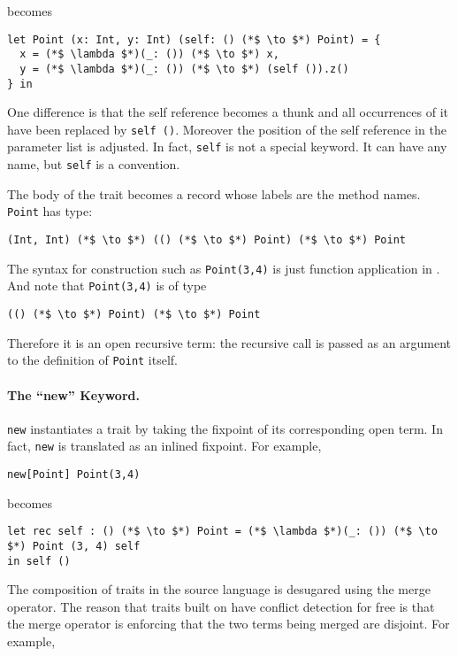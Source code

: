 \noindent becomes

\begin{lstlisting}
let Point (x: Int, y: Int) (self: () (*$ \to $*) Point) = {
  x = (*$ \lambda $*)(_: ()) (*$ \to $*) x,
  y = (*$ \lambda $*)(_: ()) (*$ \to $*) (self ()).z()
} in
\end{lstlisting}

One difference is that the self reference becomes a thunk and all occurrences of
it have been replaced by \lstinline$self ()$. Moreover the position of the self
reference in the parameter list is adjusted. In fact, \lstinline$self$ is not a
special keyword. It can have any name, but \lstinline$self$ is a
convention.

The body of the trait becomes a record whose labels are the method names.
\lstinline$Point$ has type:

\begin{lstlisting}
(Int, Int) (*$ \to $*) (() (*$ \to $*) Point) (*$ \to $*) Point
\end{lstlisting}

The syntax for construction such as \lstinline$Point(3,4)$ is just function
application in \name. And note that \lstinline$Point(3,4)$ is of type
\begin{lstlisting}
(() (*$ \to $*) Point) (*$ \to $*) Point
\end{lstlisting}

Therefore it is an open recursive term: the recursive call is passed
as an argument to the definition of \lstinline$Point$ itself.

\paragraph{The ``new'' Keyword.} \lstinline$new$ instantiates a trait by taking the
fixpoint of its corresponding open term. In fact, \lstinline$new$ is translated as
an inlined fixpoint. For example,

\begin{lstlisting}
new[Point] Point(3,4)
\end{lstlisting}

\noindent becomes

\begin{lstlisting}
let rec self : () (*$ \to $*) Point = (*$ \lambda $*)(_: ()) (*$ \to $*) Point (3, 4) self
in self ()
\end{lstlisting}

The composition of traits in the source language is desugared using the merge
operator. The reason that traits built on \name have conflict detection for free
is that the merge operator is enforcing that the two terms being merged are
disjoint. For example,

